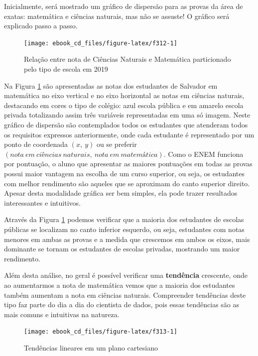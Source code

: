 \documentclass[
  portuguese,
  oneside]{book}
\begin{document}
Inicialmente, será mostrado um gráfico de dispersão para as provas da área de exatas: matemática e ciências naturais, mas não se assuste! O gráfico será explicado passo a passo.

\begin{figure}

{\centering \texttt{[image: ebook\_cd\_files/figure-latex/f312-1]} 

}

\caption{Relação entre nota de Ciências Naturais e Matemática particionado pelo tipo de escola em 2019}\label{fig:f312}
\end{figure}

Na Figura \ref{fig:f312} são apresentadas as notas dos estudantes de Salvador em matemática no eixo vertical e no eixo horizontal as notas em ciências naturais, destacando em cores o tipo de colégio: azul escola pública e em amarelo escola privada totalizando assim três variáveis representadas em uma só imagem. Neste gráfico de dispersão são contemplados todos os estudantes que atenderam todos os requisitos expressos anteriormente, onde cada estudante é representado por um ponto de coordenada \((x,\ y)\) ou se preferir \((nota\ em\ ciências\ naturais,\ nota\ em\ matemática)\). Como o ENEM funciona por pontuação, o aluno que apresentar as maiores pontuações em todas as provas possui maior vantagem na escolha de um curso superior, ou seja, os estudantes com melhor rendimento são aqueles que se aproximam do canto superior direito. Apesar desta modalidade gráfica ser bem simples, ela pode trazer resultados interessantes e intuitivos.

Através da Figura \ref{fig:f312} podemos verificar que a maioria dos estudantes de escolas públicas se localizam no canto inferior esquerdo, ou seja, estudantes com notas menores em ambas as provas e a medida que crescemos em ambos os eixos, mais dominante se tornam os estudantes de escolas privadas, mostrando um maior rendimento.

Além desta análise, no geral é possível verificar uma \textbf{tendência} crescente, onde ao aumentarmos a nota de matemática vemos que a maioria dos estudantes também aumentam a nota em ciências naturais. Compreender tendências deste tipo faz parte do dia a dia do cientista de dados, pois essas tendências são as mais comuns e intuitivas na natureza.

\begin{figure}

{\centering \texttt{[image: ebook\_cd\_files/figure-latex/f313-1]} 

}

\caption{Tendências lineares em um plano cartesiano}\label{fig:f313}
\end{figure}
\end{document}
